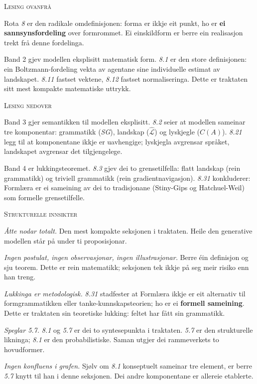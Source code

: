 \documentclass[a4paper,landscape,9pt]{article}
\begin{document}
\begin{minipage}[t]{0.325\textwidth}
{\scshape\small Lesing ovanfrå}

Rota \emph{8} er den radikale omdefinisjonen: forma er ikkje eit punkt, ho er \textbf{ei sannsynsfordeling} over formrommet. Ei einskildform er berre ein realisasjon trekt frå denne fordelinga.

Band 2 gjev modellen eksplisitt matematisk form. \emph{8.1} er den store definisjonen: ein Boltzmann-fordeling vekta av agentane sine individuelle estimat av landskapet. \emph{8.11} fastset vektene, \emph{8.12} fastset normaliseringa. Dette er traktaten sitt mest kompakte matematiske uttrykk.
\end{minipage}\hfill
\begin{minipage}[t]{0.325\textwidth}
{\scshape\small Lesing nedover}

Band 3 gjer semantikken til modellen eksplisitt. \emph{8.2} seier at modellen sameinar tre komponentar: grammatikk (\emph{SG}), landskap ($\hat{\mathcal{L}}$) og lyskjegle ($C(A)$). \emph{8.21} legg til at komponentane ikkje er uavhengige; lyskjegla avgrensar språket, landskapet avgrensar det tilgjengelege.

Band 4 er lukkingsteoremet. \emph{8.3} gjev dei to grensetilfella: flatt landskap (rein grammatikk) og triviell grammatikk (rein gradientnavigasjon). \emph{8.31} konkluderer: Formlæra er ei sameining av dei to tradisjonane (Stiny-Gips og Hatchuel-Weil) som formelle grensetilfelle.
\end{minipage}\hfill
\begin{minipage}[t]{0.325\textwidth}
{\scshape\small Strukturelle innsikter}

\emph{Åtte nodar totalt.} Den mest kompakte seksjonen i traktaten. Heile den generative modellen står på under ti proposisjonar.

\emph{Ingen postulat, ingen observasjonar, ingen illustrasjonar.} Berre éin definisjon og sju teorem. Dette er rein matematikk; seksjonen tek ikkje på seg meir risiko enn han treng.

\emph{Lukkinga er metodologisk.} \emph{8.31} stadfester at Formlæra ikkje er eit alternativ til formgrammatikken eller tanke-kunnskapsteorien; ho er ei \textbf{formell sameining}. Dette er traktaten sin teoretiske lukking: feltet har fått sin grammatikk.

\emph{Speglar \emph{5.7}.} \emph{8.1} og \emph{5.7} er dei to syntesepunkta i traktaten. \emph{5.7} er den strukturelle likninga; \emph{8.1} er den probabilistiske. Saman utgjer dei rammeverkets to hovudformer.

\emph{Ingen konfluens i grafen.} Sjølv om \emph{8.1} konseptuelt sameinar tre element, er berre \emph{5.7} knytt til han i denne seksjonen. Dei andre komponentane er allereie etablerte.
\end{minipage}
\end{document}
